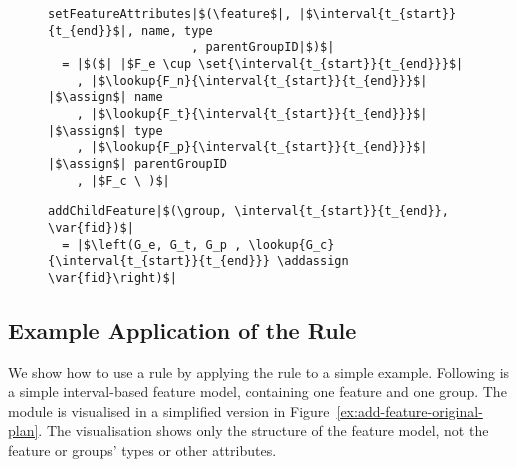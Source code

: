 \begin{figure}[h]
  \begin{verbatim}
setFeatureAttributes|$(\feature$|, |$\interval{t_{start}}{t_{end}}$|, name, type
                    , parentGroupID|$)$|
  = |$($| |$F_e \cup \set{\interval{t_{start}}{t_{end}}}$|
    , |$\lookup{F_n}{\interval{t_{start}}{t_{end}}}$| |$\assign$| name
    , |$\lookup{F_t}{\interval{t_{start}}{t_{end}}}$| |$\assign$| type
    , |$\lookup{F_p}{\interval{t_{start}}{t_{end}}}$| |$\assign$| parentGroupID
    , |$F_c \ )$|
   \end{verbatim}
  \caption{}
  \label{fun:set-feature-attributes}
\end{figure}

\begin{figure}[h]
  \begin{verbatim}
addChildFeature|$(\group, \interval{t_{start}}{t_{end}}, \var{fid})$|
  = |$\left(G_e, G_t, G_p , \lookup{G_c}{\interval{t_{start}}{t_{end}}} \addassign \var{fid}\right)$|
  \end{verbatim}
  \caption{}
  \label{fun:add-child-feature}
\end{figure}

\subsection{Example \textemdash{} Application of the  Rule}

We show how to use a rule by applying the  rule to a simple example. Following is a simple interval-based feature model, containing one feature and one group. The module is visualised in a simplified version in Figure~\ref{ex:add-feature-original-plan}. The visualisation shows only the structure of the feature model, not the feature or groups' types or other attributes.

